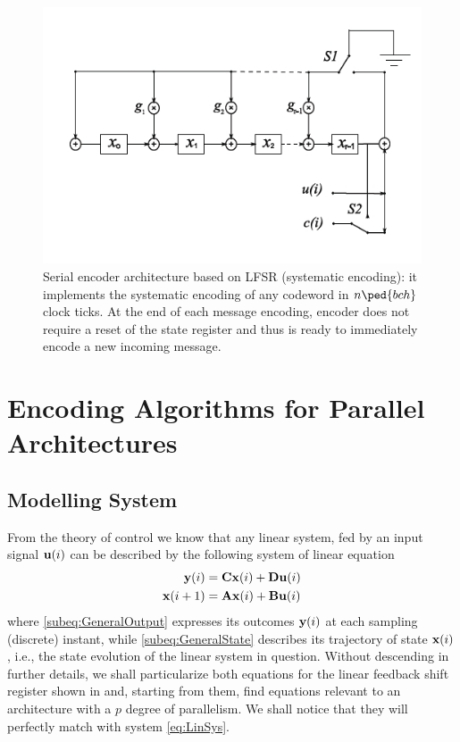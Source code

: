 \begin{figure}\centering
%
\includegraphics[scale=0.7]{serenc}
\caption{Serial encoder architecture based on LFSR (systematic encoding): it implements the systematic encoding of any codeword in \(n\ped{bch}\) clock ticks. At the end of each message encoding, encoder does not require a reset of the state register and thus is ready to immediately encode a new incoming message.} \label{fig:SerEnc}
\end{figure}

\section{Encoding Algorithms for Parallel Architectures}

\subsection{Modelling System} \label{s:model}

From the theory of control we know that any linear system, fed by an input signal \(\mathbf{u}(i)\) can be described by the following system of linear equation
\begin{subequations} \label{eq:LinSys}
\begin{align}
\mathbf{y}(i) & = \mathbf{Cx}(i) + \mathbf{Du}(i) \label{subeq:GeneralOutput} \\
\mathbf{x}(i+1) &= \mathbf{Ax}(i) + \mathbf{Bu}(i) \label{subeq:GeneralState}
\end{align}
\end{subequations}
where \eqref{subeq:GeneralOutput} expresses its outcomes \(\mathbf{y}(i)\) at each sampling (discrete) instant, while \eqref{subeq:GeneralState} describes its trajectory of state \(\mathbf{x}(i)\), i.e., the state evolution of the linear system in question. Without descending in further details, we shall particularize both equations for the linear feedback shift register shown in  and, starting from them, find equations relevant to an architecture with a \(p\) degree of parallelism. We shall notice that they will perfectly match with system \eqref{eq:LinSys}.

